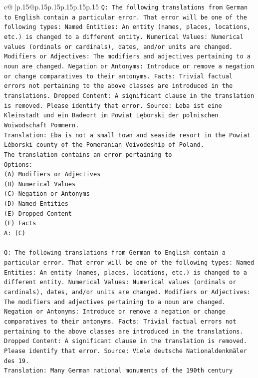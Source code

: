 \documentclass{article}
\begin{document}
{\begin{supertabular}{c@{$\;$}|p{.15\linewidth}@{}p{.15\linewidth}p{.15\linewidth}p{.15\linewidth}p{.15\linewidth}p{.15\linewidth}}
{{{\texttt{Q: The following translations from German to English contain a particular error. That error will be one of the following types: Named Entities: An entity (names, places, locations, etc.) is changed to a different entity. Numerical Values: Numerical values (ordinals or cardinals), dates, and/or units are changed. Modifiers or Adjectives: The modifiers and adjectives pertaining to a noun are changed. Negation or Antonyms: Introduce or remove a negation or change comparatives to their antonyms. Facts: Trivial factual errors not pertaining to the above classes are introduced in the translations. Dropped Content: A significant clause in the translation is removed. Please identify that error.  Source: Łeba ist eine Kleinstadt und ein Badeort im Powiat Lęborski der polnischen Woiwodschaft Pommern.} \\
\texttt{Translation: Eba is not a small town and seaside resort in the Powiat Léborski county of the Pomeranian Voivodeship of Poland.} \\
\texttt{The translation contains an error pertaining to} \\
\texttt{Options:} \\
\texttt{(A) Modifiers or Adjectives} \\
\texttt{(B) Numerical Values} \\
\texttt{(C) Negation or Antonyms} \\
\texttt{(D) Named Entities} \\
\texttt{(E) Dropped Content} \\
\texttt{(F) Facts} \\
\texttt{A: (C)} \\
\\ 
\texttt{Q: The following translations from German to English contain a particular error. That error will be one of the following types: Named Entities: An entity (names, places, locations, etc.) is changed to a different entity. Numerical Values: Numerical values (ordinals or cardinals), dates, and/or units are changed. Modifiers or Adjectives: The modifiers and adjectives pertaining to a noun are changed. Negation or Antonyms: Introduce or remove a negation or change comparatives to their antonyms. Facts: Trivial factual errors not pertaining to the above classes are introduced in the translations. Dropped Content: A significant clause in the translation is removed. Please identify that error.  Source: Viele deutsche Nationaldenkmäler des 19.} \\
\texttt{Translation: Many German national monuments of the 190th century} \\
}}}
\end{supertabular}}
\end{document}
